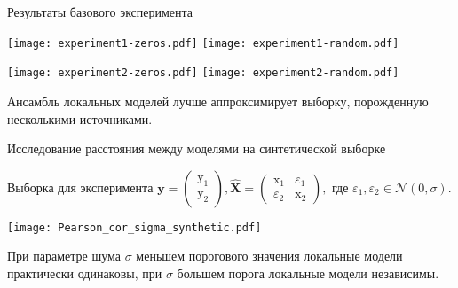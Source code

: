 \documentclass[9pt,pdf,hyperref={unicode}]{beamer}
\begin{document}
\begin{frame}{Результаты базового эксперимента}

  \begin{minipage}[t]{0.49\textwidth} 
    \begin{center}
    \texttt{[image: experiment1-zeros.pdf]}
    \texttt{[image: experiment1-random.pdf]}  \end{center}
    \end{minipage}%
    \begin{minipage}[t]{0.49\textwidth} 
    \begin{center}
    \texttt{[image: experiment2-zeros.pdf]}
    \texttt{[image: experiment2-random.pdf]}  \end{center}
    \end{minipage}
    Ансамбль локальных моделей лучше аппроксимирует выборку, порожденную несколькими источниками.
\end{frame}

\begin{frame}{Исследование расстояния между моделями на синтетической выборке}

Выборка для эксперимента
$\mathbf{y} = \begin{pmatrix}
\mathrm{y}_1\\
\mathrm{y}_2
\end{pmatrix},  \mathbf{\hat{X}} = \begin{pmatrix}
\mathrm{x}_1 & \varepsilon_1\\
\varepsilon_2 & \mathrm{x}_2
\end{pmatrix},$ где $\varepsilon_1, \varepsilon_2 \in \mathcal{N}(0,\sigma)$.

\begin{center}
\texttt{[image: Pearson\_cor\_sigma\_synthetic.pdf]}
\end{center}
При параметре шума $\sigma$ меньшем порогового значения локальные модели практически одинаковы, при $\sigma$ большем порога локальные модели независимы.

\end{frame}
\end{document}
